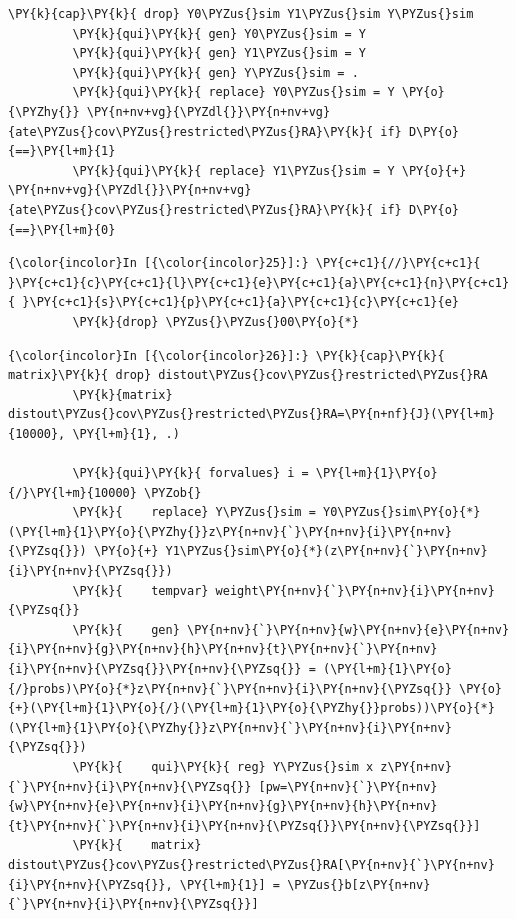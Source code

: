 \documentclass[11pt,notitlepage]{article}\usepackage[]{graphicx}\usepackage[]{color}
\makeatletter
\newenvironment{kframe}{%
 \def\at@end@of@kframe{}%
 \ifinner\ifhmode%
  \def\at@end@of@kframe{\end{minipage}}%
  \begin{minipage}{\columnwidth}%
 \fi\fi%
 \def\FrameCommand##1{\hskip\@totalleftmargin \hskip-\fboxsep
 \colorbox{shadecolor}{##1}\hskip-\fboxsep
     \hskip-\linewidth \hskip-\@totalleftmargin \hskip\columnwidth}%
 \MakeFramed {\advance\hsize-\width
   \@totalleftmargin\z@ \linewidth\hsize
   \@setminipage}}%
 {\par\unskip\endMakeFramed%
 \at@end@of@kframe}
\newenvironment{knitrout}{}{} %
\makeatother
\begin{document}
\begin{enumerate}[a)]
\begin{knitrout}
\begin{kframe}
\begin{Verbatim}[commandchars=\\\{\}]
         \PY{k}{cap}\PY{k}{ drop} Y0\PYZus{}sim Y1\PYZus{}sim Y\PYZus{}sim
         \PY{k}{qui}\PY{k}{ gen} Y0\PYZus{}sim = Y
         \PY{k}{qui}\PY{k}{ gen} Y1\PYZus{}sim = Y
         \PY{k}{qui}\PY{k}{ gen} Y\PYZus{}sim = .
         \PY{k}{qui}\PY{k}{ replace} Y0\PYZus{}sim = Y \PY{o}{\PYZhy{}} \PY{n+nv+vg}{\PYZdl{}}\PY{n+nv+vg}{ate\PYZus{}cov\PYZus{}restricted\PYZus{}RA}\PY{k}{ if} D\PY{o}{==}\PY{l+m}{1}
         \PY{k}{qui}\PY{k}{ replace} Y1\PYZus{}sim = Y \PY{o}{+} \PY{n+nv+vg}{\PYZdl{}}\PY{n+nv+vg}{ate\PYZus{}cov\PYZus{}restricted\PYZus{}RA}\PY{k}{ if} D\PY{o}{==}\PY{l+m}{0}
\end{Verbatim}

    \begin{Verbatim}[commandchars=\\\{\}]
{\color{incolor}In [{\color{incolor}25}]:} \PY{c+c1}{//}\PY{c+c1}{ }\PY{c+c1}{c}\PY{c+c1}{l}\PY{c+c1}{e}\PY{c+c1}{a}\PY{c+c1}{n}\PY{c+c1}{ }\PY{c+c1}{s}\PY{c+c1}{p}\PY{c+c1}{a}\PY{c+c1}{c}\PY{c+c1}{e}
         \PY{k}{drop} \PYZus{}\PYZus{}00\PY{o}{*}
\end{Verbatim}

    \begin{Verbatim}[commandchars=\\\{\}]
{\color{incolor}In [{\color{incolor}26}]:} \PY{k}{cap}\PY{k}{ matrix}\PY{k}{ drop} distout\PYZus{}cov\PYZus{}restricted\PYZus{}RA 
         \PY{k}{matrix} distout\PYZus{}cov\PYZus{}restricted\PYZus{}RA=\PY{n+nf}{J}(\PY{l+m}{10000}, \PY{l+m}{1}, .)
                
         \PY{k}{qui}\PY{k}{ forvalues} i = \PY{l+m}{1}\PY{o}{/}\PY{l+m}{10000} \PYZob{}
         \PY{k}{	replace} Y\PYZus{}sim = Y0\PYZus{}sim\PY{o}{*}(\PY{l+m}{1}\PY{o}{\PYZhy{}}z\PY{n+nv}{`}\PY{n+nv}{i}\PY{n+nv}{\PYZsq{}}) \PY{o}{+} Y1\PYZus{}sim\PY{o}{*}(z\PY{n+nv}{`}\PY{n+nv}{i}\PY{n+nv}{\PYZsq{}})
         \PY{k}{	tempvar} weight\PY{n+nv}{`}\PY{n+nv}{i}\PY{n+nv}{\PYZsq{}}
         \PY{k}{	gen} \PY{n+nv}{`}\PY{n+nv}{w}\PY{n+nv}{e}\PY{n+nv}{i}\PY{n+nv}{g}\PY{n+nv}{h}\PY{n+nv}{t}\PY{n+nv}{`}\PY{n+nv}{i}\PY{n+nv}{\PYZsq{}}\PY{n+nv}{\PYZsq{}} = (\PY{l+m}{1}\PY{o}{/}probs)\PY{o}{*}z\PY{n+nv}{`}\PY{n+nv}{i}\PY{n+nv}{\PYZsq{}} \PY{o}{+}(\PY{l+m}{1}\PY{o}{/}(\PY{l+m}{1}\PY{o}{\PYZhy{}}probs))\PY{o}{*}(\PY{l+m}{1}\PY{o}{\PYZhy{}}z\PY{n+nv}{`}\PY{n+nv}{i}\PY{n+nv}{\PYZsq{}})
         \PY{k}{	qui}\PY{k}{ reg} Y\PYZus{}sim x z\PY{n+nv}{`}\PY{n+nv}{i}\PY{n+nv}{\PYZsq{}} [pw=\PY{n+nv}{`}\PY{n+nv}{w}\PY{n+nv}{e}\PY{n+nv}{i}\PY{n+nv}{g}\PY{n+nv}{h}\PY{n+nv}{t}\PY{n+nv}{`}\PY{n+nv}{i}\PY{n+nv}{\PYZsq{}}\PY{n+nv}{\PYZsq{}}]	
         \PY{k}{	matrix} distout\PYZus{}cov\PYZus{}restricted\PYZus{}RA[\PY{n+nv}{`}\PY{n+nv}{i}\PY{n+nv}{\PYZsq{}}, \PY{l+m}{1}] = \PYZus{}b[z\PY{n+nv}{`}\PY{n+nv}{i}\PY{n+nv}{\PYZsq{}}]
         

\end{Verbatim}
\end{kframe}
\end{knitrout}
\end{enumerate}
\end{document}
